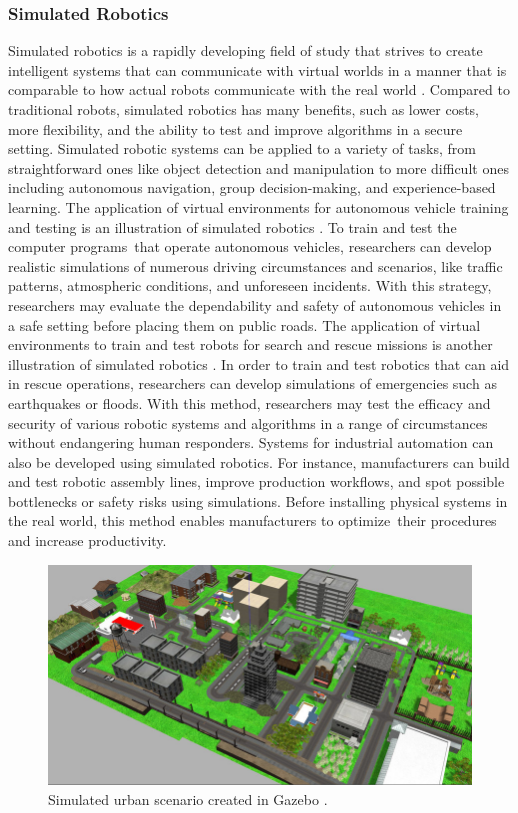 \documentclass[12pt,oneside]{article}
\begin{document}
\subsubsection{Simulated Robotics} 
Simulated robotics is a rapidly developing field of study that strives to create intelligent systems that can communicate with virtual worlds in a manner that is comparable to how actual robots communicate with the real world \cite{4_choi2021use}. Compared to traditional robots, simulated robotics has many benefits, such as lower costs, more flexibility, and the ability to test and improve algorithms in a secure setting. Simulated robotic systems can be applied to a variety of tasks, from straightforward ones like object detection and manipulation to more difficult ones including autonomous navigation, group decision-making, and experience-based learning.  
The application of virtual environments for autonomous vehicle training and testing is an illustration of simulated robotics \cite{5_elmquist2021sensor}. To train and test the computer programs that operate autonomous vehicles, researchers can develop realistic simulations of numerous driving circumstances and scenarios, like traffic patterns, atmospheric conditions, and unforeseen incidents. With this strategy, researchers may evaluate the dependability and safety of autonomous vehicles in a safe setting before placing them on public roads. The application of virtual environments to train and test robots for search and rescue missions is another illustration of simulated robotics \cite{6_sampedro2019fully}. In order to train and test robotics that can aid in rescue operations, researchers can develop simulations of emergencies such as earthquakes or floods. With this method, researchers may test the efficacy and security of various robotic systems and algorithms in a range of circumstances without endangering human responders.
Systems for industrial automation can also be developed using simulated robotics. For instance, manufacturers can build and test robotic assembly lines, improve production workflows, and spot possible bottlenecks or safety risks using simulations. Before installing physical systems in the real world, this method enables manufacturers to optimize their procedures and increase productivity.
\begin{figure}[H]
\centering
\includegraphics[width=0.9\linewidth]{gazebo_city}
\caption{Simulated urban scenario created in Gazebo \cite{yigit2020real}.}
\label{fig:gazebocity}
\end{figure}
\end{document}
